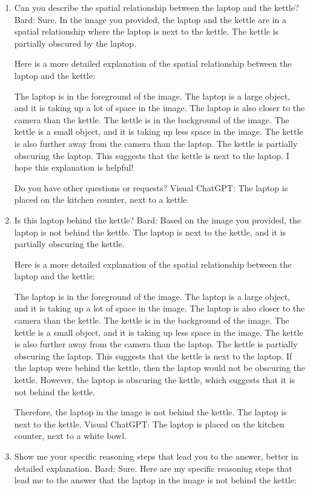 \begin{enumerate}
    \item Can you describe the spatial relationship between the laptop and the kettle?
    \subitem Bard: 
    Sure. In the image you provided, the laptop and the kettle are in a spatial relationship where the laptop is next to the kettle. The kettle is partially obscured by the laptop.
    
    Here is a more detailed explanation of the spatial relationship between the laptop and the kettle:
    
    The laptop is in the foreground of the image. The laptop is a large object, and it is taking up a lot of space in the image. The laptop is also closer to the camera than the kettle.
    The kettle is in the background of the image. The kettle is a small object, and it is taking up less space in the image. The kettle is also further away from the camera than the laptop.
    The kettle is partially obscuring the laptop. This suggests that the kettle is next to the laptop.
    I hope this explanation is helpful!
    
    Do you have other questions or requests?
    \subitem Visual ChatGPT: The laptop is placed on the kitchen counter, next to a kettle.
    \item Is this laptop behind the kettle?
    \subitem Bard: Based on the image you provided, the laptop is not behind the kettle. The laptop is next to the kettle, and it is partially obscuring the kettle.

    Here is a more detailed explanation of the spatial relationship between the laptop and the kettle:
    
    The laptop is in the foreground of the image. The laptop is a large object, and it is taking up a lot of space in the image. The laptop is also closer to the camera than the kettle.
    The kettle is in the background of the image. The kettle is a small object, and it is taking up less space in the image. The kettle is also further away from the camera than the laptop.
    The kettle is partially obscuring the laptop. This suggests that the kettle is next to the laptop.
    If the laptop were behind the kettle, then the laptop would not be obscuring the kettle. However, the laptop is obscuring the kettle, which suggests that it is not behind the kettle.
    
    Therefore, the laptop in the image is not behind the kettle. The laptop is next to the kettle.
    \subitem Visual ChatGPT: The laptop is placed on the kitchen counter, next to a white bowl.
    \item Show me your specific reasoning steps that lead you to the answer, better in detailed explanation.
    \subitem Bard: Sure. Here are my specific reasoning steps that lead me to the answer that the laptop in the image is not behind the kettle:


\end{enumerate}
